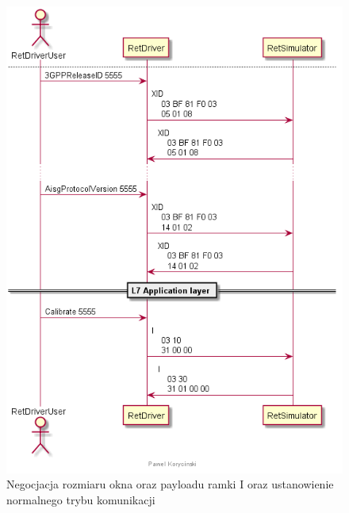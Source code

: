     \begin{figure}[h!]
    \centering
    \includegraphics[scale=0.75]{out/Diagramy/UML_DiagramOfSequence_New/RetCalibration-page4.png}
    \caption{Negocjacja rozmiaru okna oraz payloadu ramki I oraz ustanowienie normalnego trybu komunikacji}
    \end{figure}

